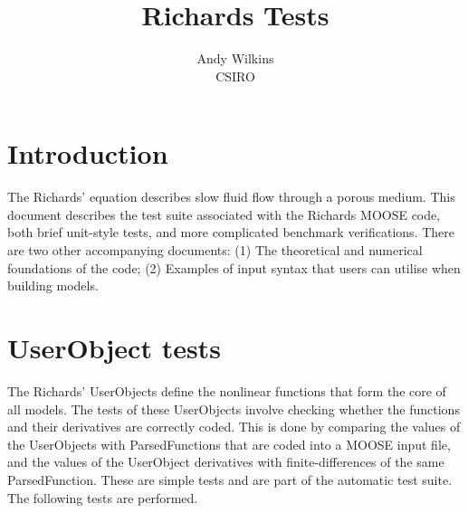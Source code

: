 \documentclass[]{scrreprt}
\begin{document}
\title{Richards Tests}
\author{Andy Wilkins \\
CSIRO}
\maketitle

\tableofcontents

\chapter{Introduction}

The Richards' equation describes slow fluid flow through a porous
medium.  This document describes the test suite associated with the
Richards MOOSE code, both brief unit-style tests, and more complicated
benchmark verifications.  There are two other accompanying documents: (1)
The theoretical and numerical foundations of the code; (2) Examples of
input syntax that users can utilise when building models.


\chapter{UserObject tests}

The Richards' UserObjects define the nonlinear functions that form the
core of all models.  The tests of these UserObjects involve checking
whether the functions and their derivatives are correctly coded.  This
is done by comparing the values of the UserObjects with
ParsedFunctions that are coded into a MOOSE input file, and the values
of the UserObject derivatives with finite-differences of the same
ParsedFunction.  These are simple tests and are part of the automatic
test suite.  The following tests are performed.
\end{document}
